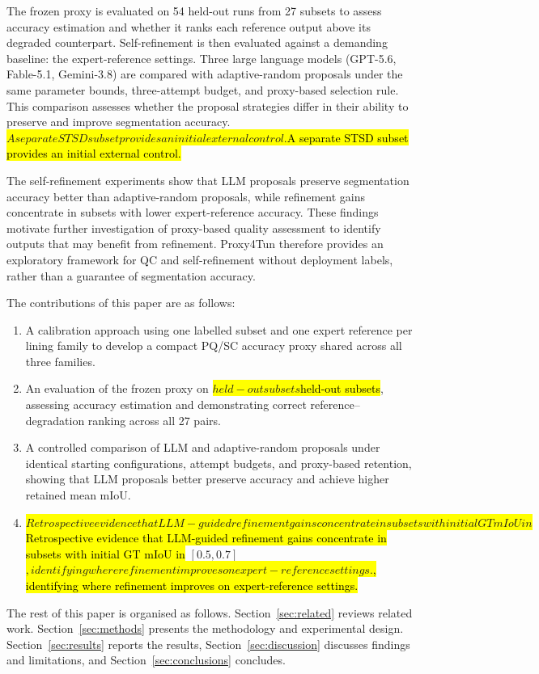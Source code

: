 \documentclass[a4paper,fleqn]{cas-dc}
\let\texthl\hl
\renewcommand{\hl}[1]{\ifmmode\colorbox{yellow}{\ensuremath{#1}}\else\texthl{#1}\fi}
\begin{document}
The frozen proxy is evaluated on 54 held-out runs from 27 subsets to assess accuracy estimation and whether it ranks each reference output above its degraded counterpart. Self-refinement is then evaluated against a demanding baseline: the expert-reference settings. Three large language models (GPT-5.6, Fable-5.1, Gemini-3.8) are compared with adaptive-random proposals under the same parameter bounds, three-attempt budget, and proxy-based selection rule. This comparison assesses whether the proposal strategies differ in their ability to preserve and improve segmentation accuracy. \hl{A separate STSD subset provides an initial external control.}

The self-refinement experiments show that LLM proposals preserve segmentation accuracy better than adaptive-random proposals, while refinement gains concentrate in subsets with lower expert-reference accuracy. These findings motivate further investigation of proxy-based quality assessment to identify outputs that may benefit from refinement. Proxy4Tun therefore provides an exploratory framework for QC and self-refinement without deployment labels, rather than a guarantee of segmentation accuracy.

The contributions of this paper are as follows:
\begin{enumerate}
\item A calibration approach using one labelled subset and one expert reference per lining family to develop a compact PQ/SC accuracy proxy shared across all three families.
\item An evaluation of the frozen proxy on \hl{held-out subsets}, assessing accuracy estimation and demonstrating correct reference--degradation ranking across all 27 pairs.
\item A controlled comparison of LLM and adaptive-random proposals under identical starting configurations, attempt budgets, and proxy-based retention, showing that LLM proposals better preserve accuracy and achieve higher retained mean mIoU.
\item \hl{Retrospective evidence that LLM-guided refinement gains concentrate in subsets with initial GT mIoU in} $[0.5,0.7]$\hl{, identifying where refinement improves on expert-reference settings.}
\end{enumerate}

The rest of this paper is organised as follows. Section~\ref{sec:related} reviews related work. Section~\ref{sec:methods} presents the methodology and experimental design. Section~\ref{sec:results} reports the results, Section~\ref{sec:discussion} discusses findings and limitations, and Section~\ref{sec:conclusions} concludes.
\end{document}
